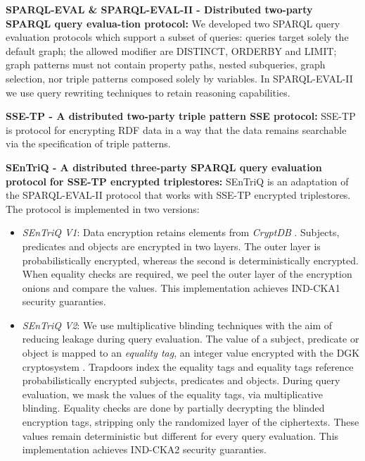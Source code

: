 \begin{description}
    \item \textbf{SPARQL-EVAL \& SPARQL-EVAL-II - Distributed two-party \gls{SPARQL} query evalua-}\linebreak \textbf{tion protocol:} We developed two \gls{SPARQL} query evaluation protocols which support a subset of queries: queries target solely the default graph; the allowed modifier are DISTINCT, ORDERBY and LIMIT; graph patterns must not contain property paths, nested subqueries, graph selection, nor triple patterns composed solely by variables. In SPARQL-EVAL-II we use query rewriting techniques to retain reasoning capabilities. 
    
    \item \textbf{SSE-TP - A distributed two-party triple pattern \gls{SSE} protocol:} 
    SSE-TP is protocol for encrypting \gls{RDF} data in a way that the data remains searchable via the specification of triple patterns. 

    \item \textbf{\gls{SEnTriQ} - A distributed three-party \gls{SPARQL} query evaluation protocol} \linebreak \textbf{ for SSE-TP encrypted triplestores:}   
    \gls{SEnTriQ} is an adaptation of the SPARQL-EVAL-II protocol that works with SSE-TP encrypted triplestores. The protocol is implemented in two versions:
    \begin{itemize} 
    
        \item \emph{\gls{SEnTriQ} V1}: Data encryption retains elements from \emph{CryptDB} \autocite{Popa2011-zb, Popa2012-bw, Popa2011-ci}. Subjects, predicates and objects are encrypted in two layers. The outer layer is probabilistically encrypted, whereas the second is deterministically encrypted. When equality checks are required, we peel the outer layer of the encryption onions and compare the values. This implementation achieves \gls{IND-CKA1} security guaranties.
    
        \item \emph{\gls{SEnTriQ} V2}: We use multiplicative blinding techniques with the aim of reducing leakage during query evaluation. The value of a subject, predicate or object is mapped to an \emph{equality tag}, an integer value encrypted with the \gls{DGK} cryptosystem \autocite{Damgard2007-km, Damgard2009-my, Franz2011-sm, Makkes2010-qb}. Trapdoors index the equality tags and equality tags reference probabilistically encrypted subjects, predicates and objects. During query evaluation, we mask the values of the equality tags, via multiplicative blinding. Equality checks are done by partially decrypting the blinded encryption tags, stripping only the randomized layer of the ciphertexts. These values remain deterministic but different for every query evaluation. This implementation achieves \gls{IND-CKA2} security guaranties.
    \end{itemize}
\end{description}

